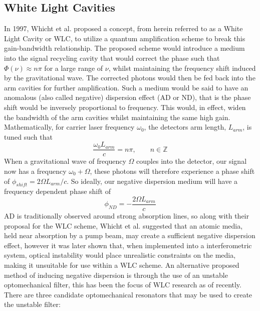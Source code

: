 \documentclass[aps,  
                a4paper, 
                amsmath, 
                amssymb, 
                preprint,
                tightenlines,  
                amsfonts,
                nofootinbib,
                onecolumn,
                titlepage,
                10pt
            ]{revtex4-2}
\begin{document}
    \subsection{White Light Cavities}
    In 1997, Whicht et al. proposed a concept, from herein referred to as a White Light Cavity or WLC, to utilize a quantum amplification scheme to break this gain-bandwidth relationship. The proposed scheme would introduce a medium into the signal recycling cavity that would correct the phase such that $\Phi(\nu)\approx n\pi$ for a large range of $\nu$, whilst maintaining the frequency shift induced by the gravitational wave. The corrected photons would then be fed back into the arm cavities for further amplification. Such a medium would be said to have an anomalous (also called negative) dispersion effect (AD or ND), that is the phase shift would be inversely proportional to frequency. This would, in effect, widen the bandwidth of the arm cavities whilst maintaining the same high gain. Mathematically, for carrier laser frequency $\omega_0$, the detectors arm length, $L_{arm}$, is tuned such that
    \begin{equation}
        \label{eq:cavity-resonance-condition}
        \frac{\omega_0L_{arm}}{c} = n\pi, \qquad n\in\mathbb{Z}
    \end{equation}
    When a gravitational wave of frequency $\Omega$ couples into the detector, our signal now has a frequency $\omega_0+\Omega$, these photons will therefore experience a phase shift of $\phi_{shift}=2\Omega L_{arm}/c$. So ideally, our negative dispersion medium will have a frequency dependent phase shift of
    \begin{equation}
        \label{eq:phase-correction}
        \phi_{ND} = -\frac{2\Omega L_{arm}}{c}
    \end{equation}
    AD is traditionally observed around strong absorption lines, so along with their proposal for the WLC scheme, Whicht et al. suggested that an atomic media, held near absorption by a pump beam, may create a sufficient negative dispersion effect, however it was later shown that, when implemented into a interferometric system, optical instability would place unrealistic constraints on the media, making it unsuitable for use within a WLC scheme. An alternative proposed method of inducing negative dispersion is through the use of an unstable optomechanical filter, this has been the focus of WLC research as of recently. There are three candidate optomechanical resonators that may be used to create the unstable filter:
\end{document}
